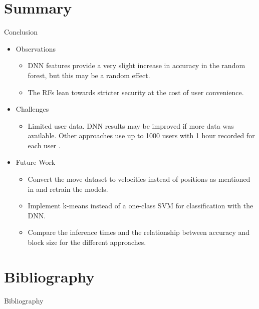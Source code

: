 \documentclass{beamer}
\begin{document}
\section{Summary}
\begin{frame}{Conclusion}
    \begin{itemize}
        \item Observations
        \begin{itemize}
            \item DNN features provide a very slight increase in accuracy in the random forest, but this may be a random effect.
            \item The RFs lean towards stricter security at the cost of user convenience. 
        \end{itemize}
        \item Challenges
        \begin{itemize}
            \item Limited user data. DNN results may be improved if more data was available. Other approaches use up to 1000 users with 1 hour recorded for each user \cite{zhengEfficientUserVerification2011}.
        \end{itemize}
        \item Future Work
        \begin{itemize}
            \item Convert the move dataset to velocities instead of positions as mentioned in \cite{antalSapiMouseMouseDynamicsbased2021} and retrain the models.
            \item Implement k-means instead of a one-class SVM for classification with the DNN.
            \item Compare the inference times and the relationship between accuracy and block size for the different approaches.
        \end{itemize}
    \end{itemize}
\end{frame}

\section{Bibliography}

\begin{frame}[allowframebreaks]{Bibliography}


\end{frame}
\end{document}

